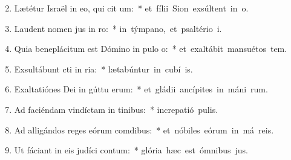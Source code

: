 \begin{flushleft}
\begin{enumerate}[leftmargin=*]
\setcounter{enumi}{1}


\item Lætétur Israël in eo, qui cit um:~* \mbox{et fílii Sion exsúltent in  o.}
\item Laudent nomen jus in ro:~* \mbox{in týmpano, et psaltério  i.}
\item Quia beneplácitum est Dómino in pulo o:~* \mbox{et exaltábit mansuétos  tem.}
\item Exsultábunt cti in ria:~* \mbox{lætabúntur in cubí is.}
\item Exaltatiónes Dei in gúttu erum:~* \mbox{et gládii ancípites in máni rum.}
\item Ad faciéndam vindíctam in tinibus:~* \mbox{increpatió  pulis.}
\item Ad alligándos reges eórum  comdibus:~* \mbox{et nóbiles eórum in má reis.}
\item Ut fáciant in eis judíci contum:~* \mbox{glória hæc est ómnibus  jus.}

\end{enumerate}
\end{flushleft}

